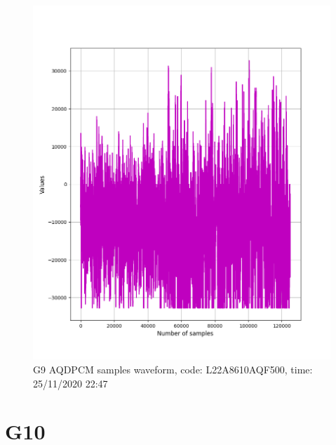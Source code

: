 \documentclass[hidelinks, 12pt, a4paper]{article}
\begin{document}
\begin{figure}[h!]
\centering
	\includegraphics[height=.38\textheight, width=\textwidth]{assets/session1/g9_aq.png}
	\caption{G9 AQDPCM samples waveform, code: L22A8610AQF500, time: 25/11/2020 22:47} 
\end{figure}


\section{G10}
\end{document}
